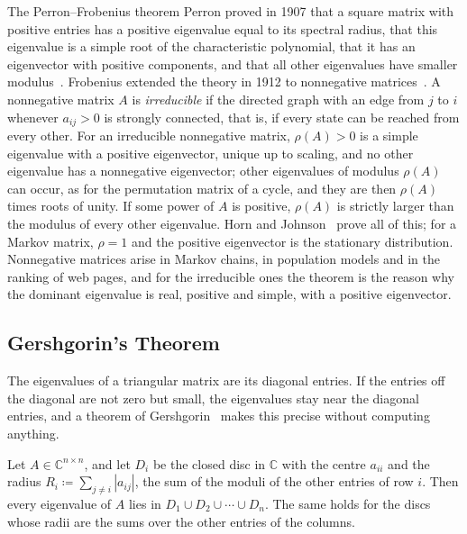 \begin{note}{The Perron--Frobenius theorem}
Perron proved in 1907 that a square matrix with positive entries has a positive eigenvalue equal to its spectral radius, that this eigenvalue is a simple root of the characteristic polynomial, that it has an eigenvector with positive components, and that all other eigenvalues have smaller modulus~\cite{perron1907}. Frobenius extended the theory in 1912 to nonnegative matrices~\cite{frobenius1912}. A nonnegative matrix $A$ is \emph{irreducible} if the directed graph with an edge from $j$ to $i$ whenever $a_{ij}>0$ is strongly connected, that is, if every state can be reached from every other. For an irreducible nonnegative matrix, $\rho(A)>0$ is a simple eigenvalue with a positive eigenvector, unique up to scaling, and no other eigenvalue has a nonnegative eigenvector; other eigenvalues of modulus $\rho(A)$ can occur, as for the permutation matrix of a cycle, and they are then $\rho(A)$ times roots of unity. If some power of $A$ is positive, $\rho(A)$ is strictly larger than the modulus of every other eigenvalue. Horn and Johnson~\cite[Chap.~8]{horn2013} prove all of this; for a Markov matrix, $\rho=1$ and the positive eigenvector is the stationary distribution. Nonnegative matrices arise in Markov chains, in population models and in the ranking of web pages, and for the irreducible ones the theorem is the reason why the dominant eigenvalue is real, positive and simple, with a positive eigenvector.
\end{note}

\subsection{Gershgorin's Theorem}

The eigenvalues of a triangular matrix are its diagonal entries. If the entries off the diagonal are not zero but small, the eigenvalues stay near the diagonal entries, and a theorem of Gershgorin~\cite{gershgorin1931} makes this precise without computing anything.

\begin{theorem}
\label{thm:gershgorin}
Let $A\in\mathbb C^{n\times n}$, and let $D_i$ be the closed disc in $\mathbb C$ with the centre $a_{ii}$ and the radius $R_i\coloneqq\sum_{j\ne i}|a_{ij}|$, the sum of the moduli of the other entries of row $i$. Then every eigenvalue of $A$ lies in $D_1\cup D_2\cup\cdots\cup D_n$. The same holds for the discs whose radii are the sums over the other entries of the columns.
\end{theorem}

